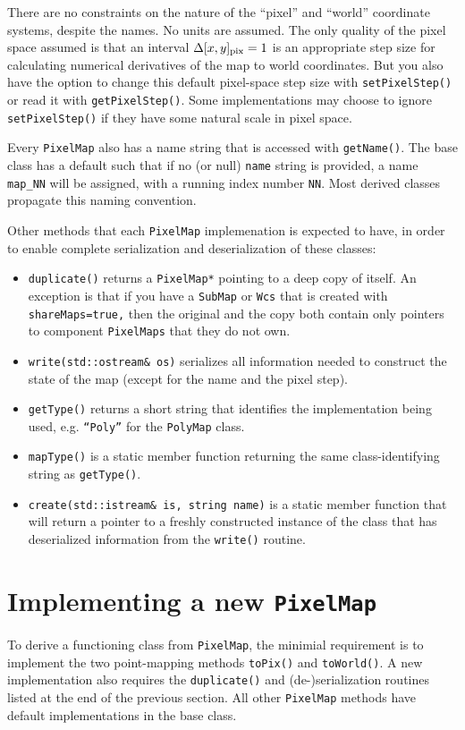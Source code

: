 \documentclass[11pt,preprint,flushrt]{aastex}
\begin{document}
There are no constraints on the nature of the ``pixel'' and ``world'' coordinate systems, despite the names.  No units are assumed.  The only quality of the pixel space assumed is that an interval $\Delta [x,y]_{\rm pix}=1$ is an appropriate step size for calculating numerical derivatives of the map to world coordinates.  But you also have the option to change this default pixel-space step size with {\tt setPixelStep()} or read it with {\tt getPixelStep()}.  Some implementations may choose to ignore {\tt setPixelStep()} if they have some natural scale in pixel space.

Every {\tt PixelMap} also has a name string that is accessed with {\tt getName()}.  The base class has a default such that if no (or null) {\tt name} string is provided, a name {\tt map\_NN} will be assigned, with a running index number  {\tt NN}.  Most derived classes propagate this naming convention.

Other methods that each {\tt PixelMap} implemenation is expected to have, in order to enable complete serialization and deserialization of these classes:
\begin{itemize}
\item {\tt duplicate()} returns a {\tt PixelMap*} pointing to a deep copy of itself. An exception is that if you have a {\tt SubMap} or {\tt Wcs} that is created with {\tt shareMaps=true,} then the original and the copy both contain only pointers to component {\tt PixelMaps} that they do not own.
\item {\tt write(std::ostream\& os)} serializes all information needed to construct the state of the map (except for the name and the pixel step).
\item {\tt getType()} returns a short string that identifies the implementation being used, e.g. {\tt ``Poly''} for the {\tt PolyMap} class.
\item {\tt mapType()} is a static member function returning the same class-identifying string as {\tt getType()}.
\item {\tt create(std::istream\& is, string name)} is a static member function that will return a pointer to a freshly constructed instance of the class that has deserialized information from the {\tt write()} routine.  
\end{itemize}

\section{Implementing a new {\tt PixelMap}}
To derive a functioning class from {\tt PixelMap}, the minimial requirement is to implement the two point-mapping methods {\tt toPix()} and {\tt toWorld()}.  A new implementation also requires the {\tt duplicate()} and (de-)serialization routines listed at the end of the previous section.  All other {\tt PixelMap} methods have default implementations in the base class.
\end{document}
